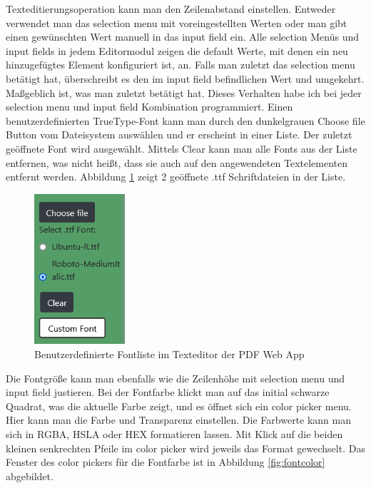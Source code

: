 Texteditierungsoperation kann man den Zeilenabstand einstellen. Entweder verwendet man das selection menu mit voreingestellten Werten oder man gibt einen gewünschten Wert manuell in das input field ein. Alle selection Menüs und input fields in jedem Editormodul zeigen die default Werte, mit denen ein neu hinzugefügtes Element konfiguriert ist, an. Falls man zuletzt das selection menu betätigt hat, überschreibt es den im input field befindlichen Wert und umgekehrt. Maßgeblich ist, was man zuletzt betätigt hat. Dieses Verhalten habe ich bei jeder selection menu und input field Kombination programmiert. Einen benutzerdefinierten TrueType-Font kann man durch den dunkelgrauen Choose file Button vom Dateisystem auswählen und er erscheint in einer Liste. Der zuletzt geöffnete Font wird ausgewählt. Mittels Clear kann man alle Fonts aus der Liste entfernen, was nicht heißt, dass sie auch auf den angewendeten Textelementen entfernt werden. Abbildung \ref{fig:custom-font} zeigt 2 geöffnete .ttf Schriftdateien in der Liste.

\begin{figure}[!htbp]
	\centering
	\includegraphics[width=0.3\textwidth]{"images/custom-font.png"}
	\caption{Benutzerdefinierte Fontliste im Texteditor der PDF Web App}
	\label{fig:custom-font}
\end{figure}

Die Fontgröße kann man ebenfalls wie die Zeilenhöhe mit selection menu und input field justieren. Bei der Fontfarbe klickt man auf das initial schwarze Quadrat, was die aktuelle Farbe zeigt, und es öffnet sich ein color picker menu. Hier kann man die Farbe und Transparenz einstellen. Die Farbwerte kann man sich in RGBA, HSLA oder HEX formatieren lassen. Mit Klick auf die beiden kleinen senkrechten Pfeile im color picker wird jeweils das Format gewechselt. Das Fenster des color pickers für die Fontfarbe ist in Abbildung \ref{fig:fontcolor} abgebildet. 

